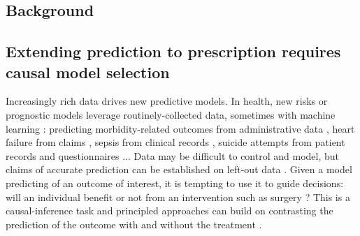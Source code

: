 \documentclass[10pt]{article}
\begin{document}
\begin{multicols}{2}

    \section{Background}\label{sec:intro}

    \subsection{Extending prediction to prescription requires causal model selection}


    Increasingly rich data drives new predictive models. In health, new risks
    or prognostic models leverage routinely-collected data, sometimes with
    machine learning \cite{mooney2018bigdata}: predicting morbidity-related
    outcomes from administrative data \cite{yurkovich2015systematic}, heart
    failure from claims \cite{desai2020comparison}, sepsis from clinical
    records \cite{horng2017creating}, suicide attempts from patient records
    and questionnaires \cite{simon2018predicting}... Data may be difficult to
    control and model, but claims of accurate prediction can be established
    on left-out data
    \cite{altman2009prognosis,poldrack2020establishment,varoquaux2022evaluating}.
    Given a model predicting of an outcome of interest, it is tempting to use
    it to guide decisions: will an individual benefit or not from an
    intervention such as surgery \cite{fontana2019can}? This is a
    causal-inference task and principled approaches can build
    on contrasting the
    prediction of the outcome with and without the treatment
    \cite{snowden_implementation_2011,blakely2020reflection}.


\end{multicols}
\end{document}
